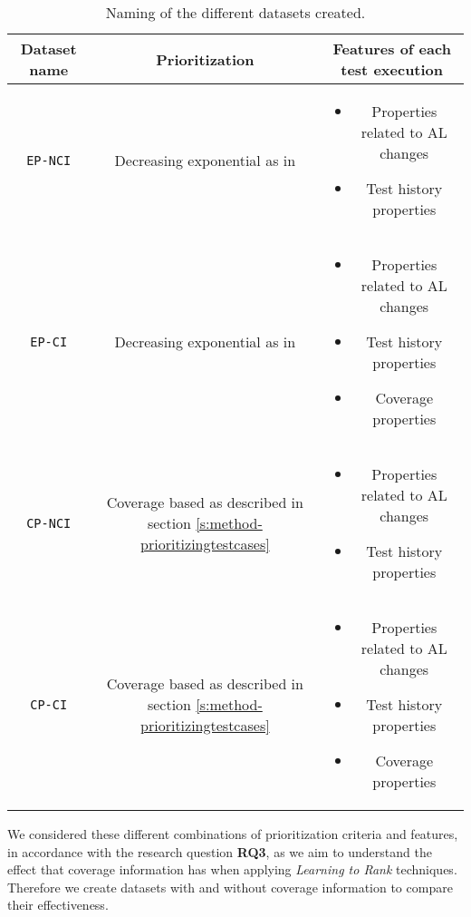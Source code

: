 \begin{table}[h!]
    \centering
    {\renewcommand{\arraystretch}{2.5}
    \begin{tabular}{|c|c|c|}
        \hline
        \textbf{Dataset name} & \textbf{Prioritization} & \textbf{Features of each test execution} \\
        \hline
        \parbox{0.12\textwidth}{\texttt{EP-NCI}} & \parbox{0.30\textwidth}{Decreasing exponential as in \cite{Bertolino2020LearningtoRankVR}} & \parbox{0.40\textwidth}{
            \begin{itemize}
                \item Properties related to AL changes
                \item Test history properties
            \end{itemize}
        } \\
        \hline
        \parbox{0.12\textwidth}{\texttt{EP-CI}} & \parbox{0.30\textwidth}{Decreasing exponential as in \cite{Bertolino2020LearningtoRankVR}} & \parbox{0.40\textwidth}{
            \begin{itemize}
                \item Properties related to AL changes
                \item Test history properties
                \item Coverage properties
            \end{itemize}
        } \\
        \hline
        \parbox{0.12\textwidth}{\texttt{CP-NCI}} & \parbox{0.30\textwidth}{Coverage based as described in section \ref{s:method-prioritizingtestcases}} & \parbox{0.40\textwidth}{
            \begin{itemize}
                \item Properties related to AL changes
                \item Test history properties
            \end{itemize}
        } \\
        \hline
        \parbox{0.12\textwidth}{\texttt{CP-CI}} & \parbox{0.30\textwidth}{Coverage based as described in section \ref{s:method-prioritizingtestcases}} & \parbox{0.40\textwidth}{
            \begin{itemize}
                \item Properties related to AL changes
                \item Test history properties
                \item Coverage properties
            \end{itemize}
        } \\
        \hline
    \end{tabular} }
    \caption{Naming of the different datasets created.}
    \label{f:table-naming-datasets}
\end{table}

We considered these different combinations of prioritization criteria and features, in accordance with
the research question \textbf{RQ3}, as we aim to understand the effect that coverage information has 
when applying \emph{Learning to Rank} techniques. Therefore we create datasets with and without coverage
information to compare their effectiveness.
